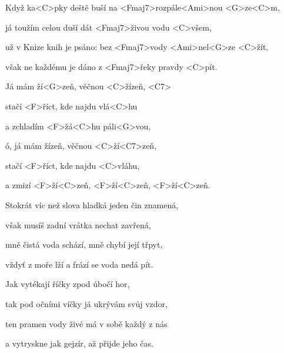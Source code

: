 

\zs
Když ka<C>pky deště buší na <Fmaj7>rozpále<Ami>nou <G>ze<C>m,

já toužím celou duší dát <Fmaj7>živou vodu <C>všem,

už v Knize knih je psáno: bez <Fmaj7>vody <Ami>nel<G>ze <C>žít,

však ne každému je dáno z <Fmaj7>řeky pravdy <C>pít.
\ks

\zr
Já mám ží<G>zeň, věčnou <C>žízeň, <C7>

stačí <F>říct, kde najdu vlá<C>hu

a zchladím <F>žá<C>hu páli<G>vou,

ó, já mám žízeň, věčnou <C>ží<C7>zeň,

stačí <F>říct, kde najdu <C>vláhu,

a zmizí <F>ží<C>zeň, <F>ží<C>zeň, <F>ží<C>zeň.
\kr

\zs
Stokrát víc než slova hladká jeden čin znamená,

však musíš zadní vrátka nechat zavřená,

mně čistá voda schází, mně chybí její třpyt,

vždyť z moře lží a frází se voda nedá pít.
\ks

\zr \kr

\zs
Jak vytékají říčky zpod úbočí hor,

tak pod očními víčky já ukrývám svůj vzdor,

ten pramen vody živé má v sobě každý z nás

a vytryskne jak gejzír, až přijde jeho čas.
\ks

\zr \kr \zr \kr

\kp
